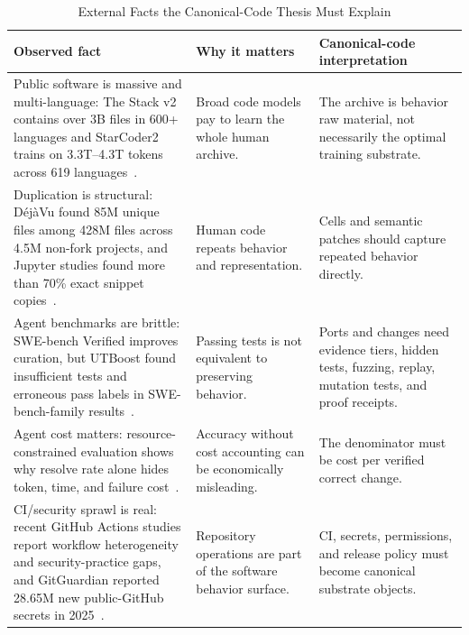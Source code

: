 \documentclass[conference]{IEEEtran}
\begin{document}
\begin{table}[!t]
\caption{External Facts the Canonical-Code Thesis Must Explain}
\label{tab:external-facts}
\centering
\footnotesize
\renewcommand{\arraystretch}{1.14}
\begin{tabularx}{\textwidth}{p{}X X}
\toprule
\textbf{Observed fact} & \textbf{Why it matters} & \textbf{Canonical-code interpretation} \\
\midrule
Public software is massive and multi-language: The Stack v2 contains over 3B files in 600+ languages and StarCoder2 trains on 3.3T--4.3T tokens across 619 languages~\cite{theStackV2,starcoder2}. & Broad code models pay to learn the whole human archive. & The archive is behavior raw material, not necessarily the optimal training substrate. \\
Duplication is structural: D\'ej\`aVu found 85M unique files among 428M files across 4.5M non-fork projects, and Jupyter studies found more than 70\% exact snippet copies~\cite{dejavu2017,jupyterClones2020}. & Human code repeats behavior and representation. & Cells and semantic patches should capture repeated behavior directly. \\
Agent benchmarks are brittle: SWE-bench Verified improves curation, but UTBoost found insufficient tests and erroneous pass labels in SWE-bench-family results~\cite{swebenchVerified,utboost}. & Passing tests is not equivalent to preserving behavior. & Ports and changes need evidence tiers, hidden tests, fuzzing, replay, mutation tests, and proof receipts. \\
Agent cost matters: resource-constrained evaluation shows why resolve rate alone hides token, time, and failure cost~\cite{metr2025,metr2026}. & Accuracy without cost accounting can be economically misleading. & The denominator must be cost per verified correct change. \\
CI/security sprawl is real: recent GitHub Actions studies report workflow heterogeneity and security-practice gaps, and GitGuardian reported 28.65M new public-GitHub secrets in 2025~\cite{ghaHeterogeneity2025,ghaEvolution2026,ghaSecurityNDSS2026,gitguardian2026}. & Repository operations are part of the software behavior surface. & CI, secrets, permissions, and release policy must become canonical substrate objects. \\
\bottomrule
\end{tabularx}
\end{table}
\end{document}
